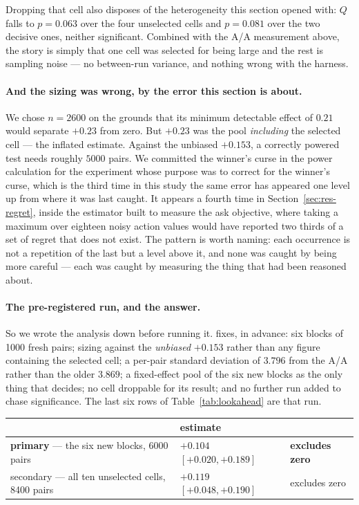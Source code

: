\documentclass[11pt,a4paper]{article}
\begin{document}
Dropping that cell also disposes of the heterogeneity this section opened with:
$Q$ falls to $p = 0.063$ over the four unselected cells and $p = 0.081$ over the
two decisive ones, neither significant. Combined with the A/A measurement above,
the story is simply that one cell was selected for being large and the rest is
sampling noise --- no between-run variance, and nothing wrong with the harness.

\paragraph{And the sizing was wrong, by the error this section is about.} We
chose $n = 2600$ on the grounds that its minimum detectable effect of $0.21$
would separate $+0.23$ from zero. But $+0.23$ was the pool \emph{including} the
selected cell --- the inflated estimate. Against the unbiased $+0.153$, a
correctly powered test needs roughly $5000$ pairs. We committed the winner's
curse in the power calculation for the experiment whose purpose was to correct
for the winner's curse, which is the third time in this study the same error has
appeared one level up from where it was last caught. It appears a fourth time in
Section~\ref{sec:res-regret}, inside the estimator built to measure the ask
objective, where taking a maximum over eighteen noisy action values would have
reported two thirds of a set of regret that does not exist. The pattern is worth
naming: each occurrence is not a repetition of the last but a level above it,
and none was caught by being more careful --- each was caught by measuring the
thing that had been reasoned about.

\paragraph{The pre-registered run, and the answer.} So we wrote the analysis
down before running it.  fixes, in
advance: six blocks of 1000 fresh pairs; sizing against the \emph{unbiased}
$+0.153$ rather than any figure containing the selected cell; a per-pair
standard deviation of $3.796$ from the A/A rather than the older $3.869$; a
fixed-effect pool of the six new blocks as the only thing that decides; no cell
droppable for its result; and no further run added to chase significance. The
last six rows of Table~\ref{tab:lookahead} are that run.

\begin{center}
\small
\begin{tabular}{lll}
\toprule
& estimate & \\
\midrule
\textbf{primary} --- the six new blocks, 6000 pairs
  & $\mathbf{+0.104}$ $[+0.020, +0.189]$ & \textbf{excludes zero} \\
secondary --- all ten unselected cells, 8400 pairs
  & $+0.119$ $[+0.048, +0.190]$ & excludes zero \\
\bottomrule
\end{tabular}
\end{center}
\end{document}
